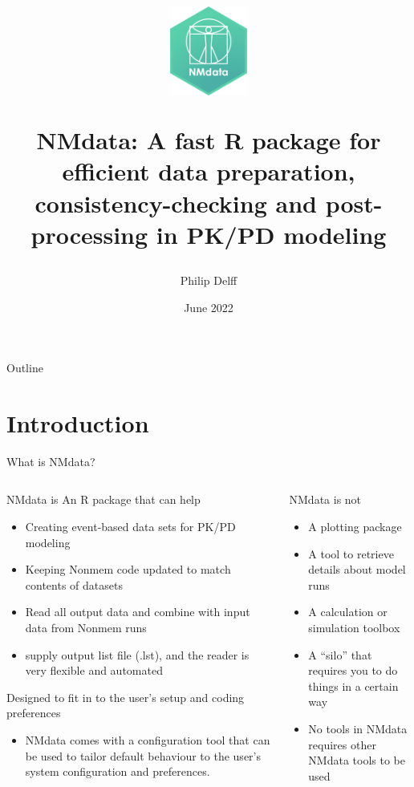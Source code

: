 \documentclass[
  8pt,
  ignorenonframetext,
  aspectratio=169]{beamer}
\title{\includegraphics[width=1in,height=\textheight]{../../man/figures/NMdata_logo_v01.png}

NMdata: A fast R package for efficient data preparation,
consistency-checking and post-processing in PK/PD modeling}
\author{Philip Delff}
\date{June 2022}
\providecommand{\tightlist}{%
  \setlength{\itemsep}{0pt}\setlength{\parskip}{0pt}}
\begin{document}
\frame{\titlepage}

\begin{frame}
\end{frame}

\begin{frame}{Outline}
\protect\hypertarget{outline}{}
\tableofcontents[hideallsubsections]
\end{frame}

\hypertarget{introduction}{%
\section{Introduction}\label{introduction}}

\begin{frame}{What is NMdata?}
\protect\hypertarget{what-is-nmdata}{}
\begin{columns}[T]
\begin{column}{0.48\textwidth}
\begin{block}{NMdata is}
\protect\hypertarget{nmdata-is}{}
An R package that can help

\begin{itemize}
\tightlist
\item
  Creating event-based data sets for PK/PD modeling
\item
  Keeping Nonmem code updated to match contents of datasets
\item
  Read all output data and combine with input data from Nonmem runs
\item
  supply output list file (.lst), and the reader is very flexible and
  automated
\end{itemize}

Designed to fit in to the user's setup and coding preferences

\begin{itemize}
\tightlist
\item
  NMdata comes with a configuration tool that can be used to tailor
  default behaviour to the user's system configuration and preferences.
\end{itemize}
\end{block}
\end{column}

\begin{column}{0.48\textwidth}
\begin{block}{NMdata is not}
\protect\hypertarget{nmdata-is-not}{}
\begin{itemize}
\item
  A plotting package
\item
  A tool to retrieve details about model runs
\item
  A calculation or simulation toolbox
\item
  A ``silo'' that requires you to do things in a certain way
\item
  No tools in NMdata requires other NMdata tools to be used
\end{itemize}
\end{block}
\end{column}
\end{columns}


\end{frame}
\end{document}
